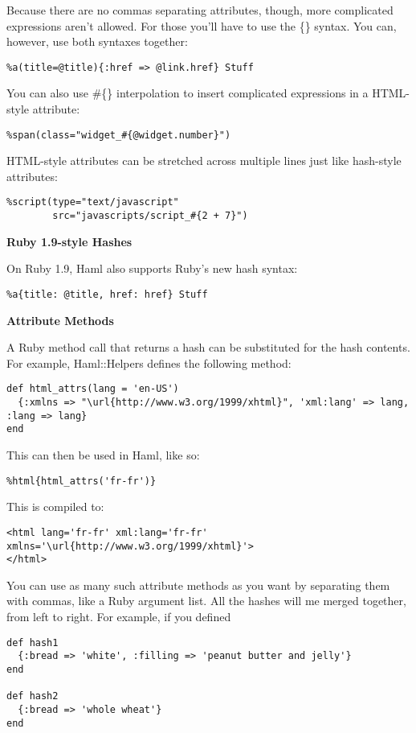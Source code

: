 \documentclass[9pt]{article}
\begin{document}
 Because there are no commas separating attributes, though, more complicated expressions aren’t allowed. For those you’ll have to use the \{\} syntax. You can, however, use both syntaxes together:
\begin{verbatim}
%a(title=@title){:href => @link.href} Stuff
\end{verbatim}


 You can also use \#\{\} interpolation to insert complicated expressions in a HTML-style attribute:
\begin{verbatim}
%span(class="widget_#{@widget.number}")
\end{verbatim}


 HTML-style attributes can be stretched across multiple lines just like hash-style attributes:
\begin{verbatim}
%script(type="text/javascript"
        src="javascripts/script_#{2 + 7}")
\end{verbatim}
\textbf{Ruby 1.9-style Hashes}


 On Ruby 1.9, Haml also supports Ruby’s new hash syntax:
\begin{verbatim}
%a{title: @title, href: href} Stuff
\end{verbatim}
\textbf{Attribute Methods}


 A Ruby method call that returns a hash can be substituted for the hash contents. For example, Haml::Helpers defines the following method:
\begin{verbatim}
def html_attrs(lang = 'en-US')
  {:xmlns => "\url{http://www.w3.org/1999/xhtml}", 'xml:lang' => lang, :lang => lang}
end
\end{verbatim}


 This can then be used in Haml, like so:
\begin{verbatim}
%html{html_attrs('fr-fr')}
\end{verbatim}


 This is compiled to:
\begin{verbatim}
<html lang='fr-fr' xml:lang='fr-fr' xmlns='\url{http://www.w3.org/1999/xhtml}'>
</html>
\end{verbatim}


 You can use as many such attribute methods as you want by separating them with commas, like a Ruby argument list. All the hashes will me merged together, from left to right. For example, if you defined
\begin{verbatim}
def hash1
  {:bread => 'white', :filling => 'peanut butter and jelly'}
end

def hash2
  {:bread => 'whole wheat'}
end
\end{verbatim}
\end{document}
